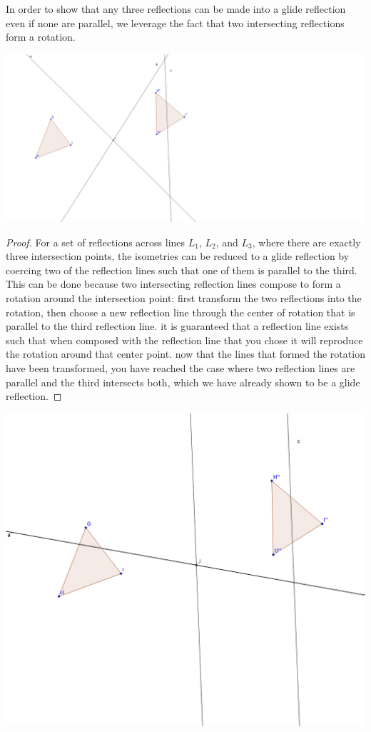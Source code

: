 \documentclass[11pt]{article}
\theoremstyle{definition}
\begin{document}
In order to show that any three reflections can be made into a glide
reflection even if none are parallel, we leverage the fact that two
intersecting reflections form a rotation.

\includegraphics[scale=.4]{intersect3}
\begin{proof}
  For a set of reflections across lines $L_{1}$, $L_{2}$, and $L_{3}$, where
  there are exactly three intersection points, the isometries can be reduced to
  a glide reflection by coercing two of the reflection lines such that one of
  them is parallel to the third. This can be done because two intersecting
  reflection lines compose to form a rotation around the intersection point:
  first transform the two reflections into the rotation, then choose a new
  reflection line through the center of rotation that is parallel to the third
  reflection line. it is guaranteed that a reflection line exists such that
  when composed with the reflection line that you chose it will reproduce the
  rotation around that center point. now that the lines that formed the
  rotation have been transformed, you have reached the case where two
  reflection lines are parallel and the third intersects both, which we have
  already shown to be a glide reflection.

\end{proof}
\includegraphics[scale=.4]{intersect21}
\end{document}
